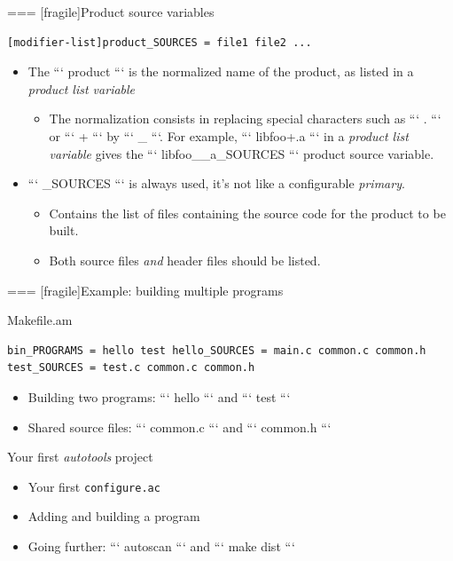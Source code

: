 === [fragile]{Product source variables}

    \begin{block}{}
{\small
\begin{verbatim}
[modifier-list]product_SOURCES = file1 file2 ...
\end{verbatim}}
\end{block}

\begin{itemize}

\item The ``` product ``` is the normalized name of the product, as
  listed in a {\em product list variable}
  \begin{itemize}
  \item The normalization consists in replacing special characters
    such as ``` . ``` or ``` + ``` by ``` _ ```. For example,
    ``` libfoo+.a ``` in a {\em product list variable} gives the
    ``` libfoo__a_SOURCES ``` product source variable.
  \end{itemize}
\item ``` _SOURCES ``` is always used, it's not like a configurable {\em
    primary}.
  \begin{itemize}
  \item Contains the list of files containing the source code for the
    product to be built.
  \item Both source files {\em and} header files should be listed.
  \end{itemize}
\end{itemize}



=== [fragile]{Example: building multiple programs}
  \begin{block}{Makefile.am}
    {\small
\begin{verbatim}
bin_PROGRAMS = hello test hello_SOURCES = main.c common.c common.h test_SOURCES = test.c common.c common.h
\end{verbatim}}
  \end{block}
  \begin{itemize}
  \item Building two programs: ``` hello ``` and ``` test ```
  \item Shared source files: ``` common.c ``` and ``` common.h ```
  \end{itemize}


\setuplabframe
{Your first {\em autotools} project}
{
  \begin{itemize}
  \item Your first {\tt configure.ac}
  \item Adding and building a program
  \item Going further: ``` autoscan ``` and ``` make dist ```
  \end{itemize}
}

